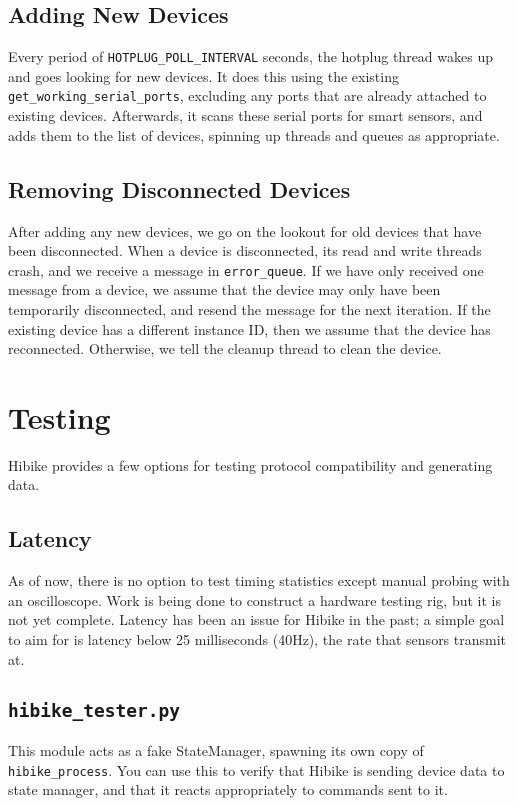 \documentclass[12pt]{book}
\begin{document}
\subsection{Adding New Devices}
Every period of \texttt{HOTPLUG\_POLL\_INTERVAL} seconds, the hotplug thread
wakes up and goes looking for new devices. It does this using the existing
\texttt{get\_working\_serial\_ports}, excluding any ports that are already
attached to existing devices. Afterwards, it scans these serial ports for smart
sensors, and adds them to the list of devices, spinning up threads and queues
as appropriate.

\subsection{Removing Disconnected Devices}
After adding any new devices, we go on the lookout for old devices that
have been disconnected. When a device is disconnected, its read and
write threads crash, and we receive a message in \texttt{error\_queue}.
If we have only received one message from a device, we assume that the device may only
have been temporarily disconnected, and resend the message for the next iteration.
If the existing device has a different instance ID, then we assume
that the device has reconnected.
Otherwise, we tell the cleanup thread to clean the device.

\section{Testing}
Hibike provides a few options for testing protocol compatibility
and generating data.


\subsection{Latency}
As of now, there is no option to test timing statistics except
manual probing with an oscilloscope. Work is being done to
construct a hardware testing rig, but it is not yet complete.
Latency has been an issue for Hibike in the past; a simple goal
to aim for is latency below 25 milliseconds (40Hz), the rate
that sensors transmit at.

\subsection{\texttt{hibike\_tester.py}}
This module acts as a fake StateManager, spawning its own
copy of \texttt{hibike\_process}. You can use this to verify
that Hibike is sending device data to state manager, and that
it reacts appropriately to commands sent to it.
\end{document}
